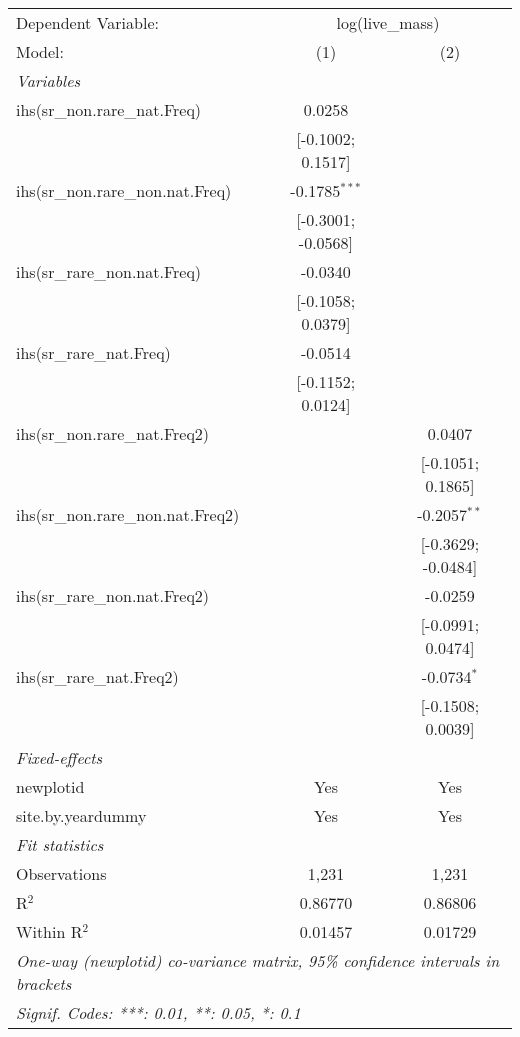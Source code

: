 \begin{tabular}{lcc}
\tabularnewline\midrule\midrule
Dependent Variable:&\multicolumn{2}{c}{log(live\_mass)}\\
Model:&(1) & (2)\\
\midrule \emph{Variables}&   &  \\
ihs(sr\_non.rare\_nat.Freq)&0.0258 &   \\
  &[-0.1002; 0.1517] &   \\
ihs(sr\_non.rare\_non.nat.Freq)&-0.1785$^{***}$ &   \\
  &[-0.3001; -0.0568] &   \\
ihs(sr\_rare\_non.nat.Freq)&-0.0340 &   \\
  &[-0.1058; 0.0379] &   \\
ihs(sr\_rare\_nat.Freq)&-0.0514 &   \\
  &[-0.1152; 0.0124] &   \\
ihs(sr\_non.rare\_nat.Freq2)&   & 0.0407\\
  &   & [-0.1051; 0.1865]\\
ihs(sr\_non.rare\_non.nat.Freq2)&   & -0.2057$^{**}$\\
  &   & [-0.3629; -0.0484]\\
ihs(sr\_rare\_non.nat.Freq2)&   & -0.0259\\
  &   & [-0.0991; 0.0474]\\
ihs(sr\_rare\_nat.Freq2)&   & -0.0734$^{*}$\\
  &   & [-0.1508; 0.0039]\\
\midrule \emph{Fixed-effects}&   &  \\
newplotid & Yes & Yes\\
site.by.yeardummy & Yes & Yes\\
\midrule \emph{Fit statistics}&  & \\
Observations & 1,231&1,231\\
R$^2$ & 0.86770&0.86806\\
Within R$^2$ & 0.01457&0.01729\\
\midrule\midrule\multicolumn{3}{l}{\emph{One-way (newplotid) co-variance matrix, 95\% confidence intervals in brackets}}\\
\multicolumn{3}{l}{\emph{Signif. Codes: ***: 0.01, **: 0.05, *: 0.1}}\\
\end{tabular}


